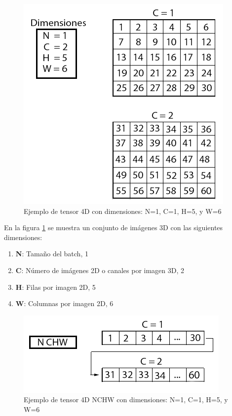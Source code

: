 \begin{figure}[H]
	\centering
	\includegraphics[scale=0.5]{imagenes/ejemplo_tensor.png}  
	\caption{Ejemplo de tensor 4D con dimensiones: N=1, C=1, H=5, y W=6}
	\label{fig:ejemplo_tensor}
\end{figure}

En la figura \ref{fig:ejemplo_tensor} se muestra un conjunto de imágenes 3D con las siguientes dimensiones:
\begin{enumerate}
	\item \textbf{N}: Tamaño del batch, 1
	\item \textbf{C}: Número de imágenes 2D o canales por imagen 3D, 2
	\item \textbf{H}: Filas por imagen 2D, 5
	\item \textbf{W}: Columnas por imagen 2D, 6
\end{enumerate}

\begin{figure}[H]
	\centering
	\includegraphics[scale=0.5]{imagenes/tensor_nchw.png}  
	\caption{Ejemplo de tensor 4D NCHW con dimensiones: N=1, C=1, H=5, y W=6}
	\label{fig:tensor_nchw}
\end{figure}

